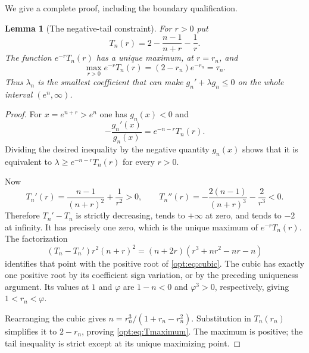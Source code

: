 \documentclass[11pt,a4paper]{article}
\newtheorem{lemma}[theorem]{Lemma}
\theoremstyle{definition}
\theoremstyle{remark}
\numberwithin{equation}{section}
\begin{document}
We give a complete proof, including the boundary qualification.

\begin{lemma}[The negative-tail constraint]\label{opt:lem:tail}
For $r>0$ put
\[
 T_n(r)=2-\frac{n-1}{n+r}-\frac1r.
\]
The function $e^{-r}T_n(r)$ has a unique maximum, at $r=r_n$, and
\begin{equation}\label{opt:eq:Tmaximum}
 \max_{r>0}e^{-r}T_n(r)=(2-r_n)e^{-r_n}=\tau_n.
\end{equation}
Thus $\lambda_n$ is the smallest coefficient that can make
$g_n'+\lambda g_n\leq0$ on the whole interval $(e^n,\infty)$.
\end{lemma}
\begin{proof}
For $x=e^{n+r}>e^n$ one has $g_n(x)<0$ and
\[
 -\frac{g_n'(x)}{g_n(x)}=e^{-n-r}T_n(r).
\]
Dividing the desired inequality by the negative quantity $g_n(x)$
shows that it is equivalent to
$\lambda\geq e^{-n-r}T_n(r)$ for every $r>0$.

Now
\[
 T_n'(r)=\frac{n-1}{(n+r)^2}+\frac1{r^2}>0,
 \qquad
 T_n''(r)=-\frac{2(n-1)}{(n+r)^3}-\frac2{r^3}<0.
\]
Therefore $T_n'-T_n$ is strictly decreasing, tends to $+\infty$
at zero, and tends to $-2$ at infinity. It has precisely one zero,
which is the unique maximum of $e^{-r}T_n(r)$. The factorization
\begin{equation}\label{opt:eq:factor}
 (T_n-T_n')r^2(n+r)^2
 =(n+2r)(r^3+nr^2-nr-n)
\end{equation}
identifies that point with the positive root of \eqref{opt:eq:cubic}.
The cubic has exactly one positive root by its coefficient sign
variation, or by the preceding uniqueness argument. Its values at $1$
and $\varphi$ are $1-n<0$ and $\varphi^3>0$, respectively, giving
$1<r_n<\varphi$.

Rearranging the cubic gives
$n=r_n^3/(1+r_n-r_n^2)$. Substitution in $T_n(r_n)$ simplifies it
to $2-r_n$, proving \eqref{opt:eq:Tmaximum}. The maximum is positive;
the tail inequality is strict except at its unique maximizing point.
\end{proof}
\end{document}

